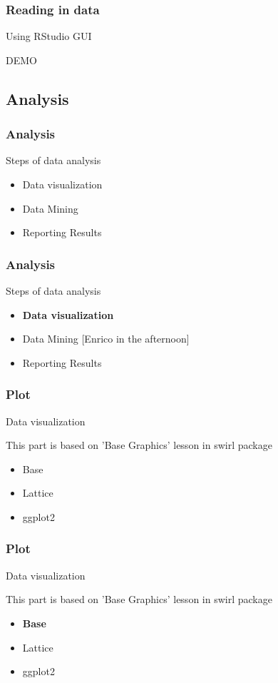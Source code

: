 \documentclass{beamer}
\begin{document}
\begin{frame}[fragile]
	\frametitle{Reading in data}
	\centering \Large Using RStudio GUI
	\vspace{40pt}

	\begin{center}	\Huge DEMO \end{center}
\end{frame}

\subsection{Analysis}
\begin{frame}[fragile]
	\frametitle{Analysis}
	\centering \Large Steps of data analysis
	\begin{itemize}
		\small
		\item Data visualization
		\item Data Mining
		\item Reporting Results
	\end{itemize}
\end{frame}


\begin{frame}[fragile]
	\frametitle{Analysis}
	\centering \Large Steps of data analysis
	\begin{itemize}
		\small
		\item \textbf{Data visualization}
		\item Data Mining [Enrico in the afternoon]
		\item Reporting Results
	\end{itemize}
\end{frame}


\begin{frame}[fragile]
	\frametitle{Plot}
	\centering \Large Data visualization

	\centering \footnotesize This part is based on 'Base Graphics' lesson in swirl package
	\begin{itemize}
		\small
		\item Base
		\item Lattice
		\item ggplot2
	\end{itemize}
\end{frame}

\begin{frame}[fragile]
	\frametitle{Plot}
	\centering \Large Data visualization
	
	\centering \footnotesize This part is based on 'Base Graphics' lesson in swirl package
	\begin{itemize}
		\small
		\item \textbf{Base}
		\item Lattice
		\item ggplot2
	\end{itemize}
\end{frame}
\end{document}
